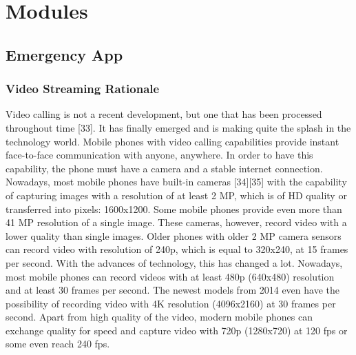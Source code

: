 \documentclass[]{article}
\begin{document}
\pagebreak
\section{Modules}
    \subsection{Emergency App}
    	\subsubsection{Video Streaming Rationale}
    	Video calling is not a recent development, but one that has been processed throughout time [33]. It has finally emerged and is making quite the splash in the technology world. Mobile phones with video calling capabilities provide instant face-to-face communication with anyone, anywhere. In order to have this capability, the phone must have a camera and a stable internet connection.\\
    	
    	Nowadays, most mobile phones have built-in cameras [34][35] with the capability of capturing images with a resolution of at least 2 MP, which is of HD quality or transferred into pixels: 1600x1200. Some mobile phones provide even more than 41 MP resolution of a single image. These cameras, however, record video with a lower quality than single images. Older phones with older 2 MP camera sensors can record video with resolution of 240p, which is equal to 320x240, at 15 frames per second. With the advances of technology, this has changed a lot. Nowadays, most mobile phones can record videos with at least 480p (640x480) resolution and at least 30 frames per second. The newest models from 2014 even have the possibility of recording video with 4K resolution (4096x2160) at 30 frames per second. Apart from high quality of the video, modern mobile phones can exchange quality for speed and capture video with 720p (1280x720) at 120 fps or some even reach 240 fps.\\
    	
\end{document}
